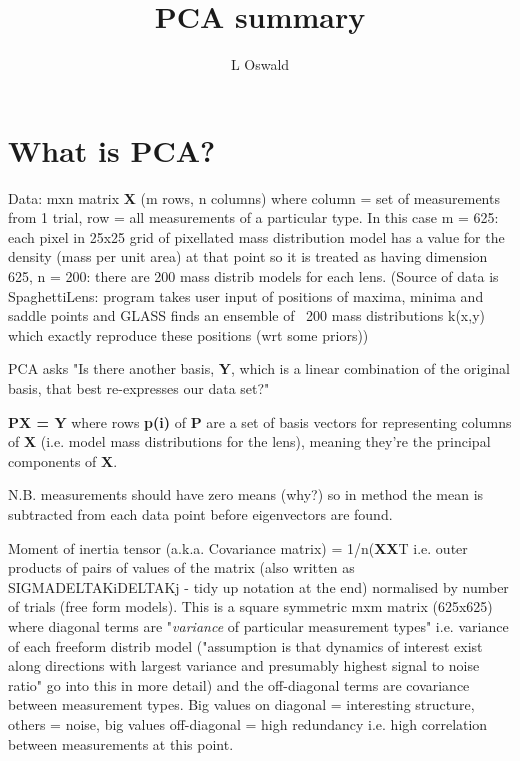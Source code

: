 \documentclass{article}
\begin{document}
\title{PCA summary}
\author{L Oswald}
\date{}

\maketitle



\section{What is PCA?}
Data: mxn matrix \textbf{X} (m rows, n columns) where column = set of measurements from 1 trial, row = all measurements of a particular type.
In this case m = 625: each pixel in 25x25 grid of pixellated mass distribution model has a value for the density (mass per unit area) at that point so it is treated as having dimension 625, 
n = 200: there are 200 mass distrib models for each lens. 
(Source of data is SpaghettiLens: program takes user input of positions of maxima, minima and saddle points and GLASS finds an ensemble of ~200 mass distributions k(x,y) which exactly reproduce these positions (wrt some priors))

PCA asks "Is there another basis, \textbf{Y}, which is a linear combination of the original basis, that best re-expresses our data set?"

\textbf{PX = Y} where rows \textbf{p(i)} of \textbf{P} are a set of basis vectors for representing columns of \textbf{X} (i.e. model mass distributions for the lens), meaning they're the principal components of \textbf{X}.

N.B. measurements should have zero means (why?) so in method the mean is subtracted from each data point before eigenvectors are found.

Moment of inertia tensor (a.k.a. Covariance matrix) = 1/n(\textbf{XX}T i.e. outer products of pairs of values of the matrix (also written as SIGMADELTAKiDELTAKj - tidy up notation at the end) normalised by number of trials (free form models).
This is a square symmetric mxm matrix (625x625) where diagonal terms are "\emph{variance} of particular measurement types" i.e. variance of each freeform distrib model ("assumption is that dynamics of interest exist along directions with largest variance and presumably highest signal to noise ratio" go into this in more detail) and the off-diagonal terms are covariance between measurement types. Big values on diagonal = interesting structure, others = noise, big values off-diagonal = high redundancy i.e. high correlation between measurements at this point.
\end{document}
